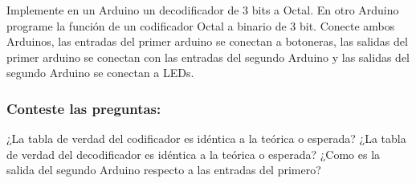 Implemente en un Arduino un decodificador de 3 bits a Octal. En otro Arduino programe la función de un codificador Octal a binario de 3 bit. Conecte ambos Arduinos, las entradas del primer arduino se conectan a botoneras, las salidas del primer arduino se conectan con las entradas del segundo Arduino y las salidas del segundo Arduino se conectan a LEDs.  


\subsubsection{Conteste las preguntas:} 
¿La tabla de verdad del codificador es idéntica a la teórica o esperada?
¿La tabla de verdad del decodificador es idéntica a la teórica o esperada?
¿Como es la salida del segundo Arduino respecto a las entradas del primero?

%
% 
% 
% 


%



